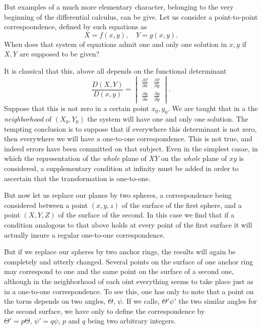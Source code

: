 \documentclass[12pt,oneside]{book}
\begin{document}
But examples of a much more elementary character, belonging to the very beginning of the differential calculus, can be give. Let us consider a point-to-point correspoondence, defined by such equations as
$$X=f(x,y),\quad Y=g(x,y).$$
When does that system of equations admit one and only one solution in $x,y$ if $X, Y$ are supposed to be given? \par

It is classical that this, above all depends on the functional determinant
$$\frac{D(X,Y)}{D(x,y)}=
    \begin{vmatrix}
        \frac{\partial f}{\partial x} & \frac{\partial f}{\partial y} \\[0.3em]
        \frac{\partial g}{\partial x} & \frac{\partial g}{\partial y}
    \end{vmatrix}. $$
Suppose that this is not zero in a certain point $x_0,y_0$. We are taught that in a the \textit{neighborhood} of $(X_0,Y_0)$ the system will have one and only one solution. The tempting conclusion is to suppose that if everywhere this determinant is not zero, then everywhere we will have a one-to-one correspondence. This is not true, and indeed errors have been committed on that subject. Even in the simplest casae, in which the representation of the \textit{whole} plane of $XY$ on the \textit{whole} plane of $xy$ is considered, a supplementary condition at infinity must be added in order to ascertain that the transformation is one-to-one. \par

But now let us replace our planes by two spheres, a correspondence being considered between a point $(x,y,z)$ of the surface of the first sphere, and a point $(X,Y,Z)$ of the surface of the second. In this case we find that if a condition analogous to that above holds at every point of the first surface it will actually insure a regular one-to-one correspondence. \par

But if we replace our spheres by two anchor rings, the results will again be completely and utterly changed. Several points on the surface of one anchor ring may correspond to one and the same point on the surface of a second one, although in the neighborhood of each oint everything seems to take place just as in a one-to-one correspondence. To see this, one has only to note that a point on the torus depends on two angles, $\Theta$, $\psi$. If we calle, $\Theta'\psi'$ the two similar angles for the second surface, we have only to define the correspondence by $\Theta'=p\Theta,\, \psi'=q\psi,\, p$ and $q$ being two arbitrary integers.\footnotemark
\end{document}
